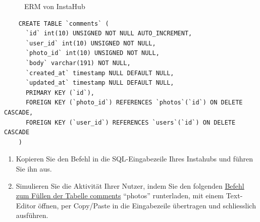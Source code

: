 \begin{figure}[H]
  \centering
  \caption{\gls{ERM} von InstaHub}
  \label{fig:erm-instahub}
\end{figure}

\begin{myexercise}
  \begin{lstlisting}
    CREATE TABLE `comments` (
      `id` int(10) UNSIGNED NOT NULL AUTO_INCREMENT,
      `user_id` int(10) UNSIGNED NOT NULL,
      `photo_id` int(10) UNSIGNED NOT NULL,
      `body` varchar(191) NOT NULL,
      `created_at` timestamp NULL DEFAULT NULL,
      `updated_at` timestamp NULL DEFAULT NULL,
      PRIMARY KEY (`id`),
      FOREIGN KEY (`photo_id`) REFERENCES `photos`(`id`) ON DELETE CASCADE,
      FOREIGN KEY (`user_id`) REFERENCES `users`(`id`) ON DELETE CASCADE
    )
  \end{lstlisting}
  \begin{enumerate}
    \item Kopieren Sie den Befehl in die SQL-Eingabezeile Ihres Instahubs und führen Sie ihn aus. 
    \item Simulieren Sie die Aktivität Ihrer Nutzer, indem Sie den folgenden \href{https://wi-wissen.github.io/instahub-doc-de/sql/comments.sql}{Befehl zum Füllen der Tabelle comments} \enquote{photos} runterladen, mit einem Text-Editor öffnen, per Copy/Paste in die Eingabezeile übertragen und schliesslich ausführen.
  \end{enumerate}

\end{myexercise}

